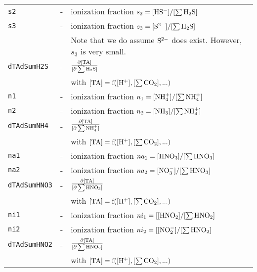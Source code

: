 \documentclass[article,nojss]{jss}
\begin{document}
\begin{footnotesize}
\begin{longtable}{l|l|p{7cm}}
\texttt{s2}       & -                                & ionization fraction $s_2 = [\rm HS^-]  / [\rm \sum H_2S]$\\
\texttt{s3}       & -                                & ionization fraction $s_3 = [\rm S^{2-}]  / [\rm \sum H_2S]$ \\
            &                                        & Note that we do assume $\rm S^{2-}$ does exist. However, $s_3$ is very small.\\
\texttt{dTAdSumH2S}   & -                               & $\rm \frac{\partial [TA]}{[\partial \sum H_2S]}$\\
                   &                                  & with $\rm [TA] = f([H^+], [\sum CO_2], ...)$\\     
\texttt{n1}       & -                                & ionization fraction $n_1 = [\rm NH_4^+] / [\rm \sum NH_4^+]$\\
\texttt{n2}       & -                                & ionization fraction $n_2 = [\rm NH_3] / [\rm \sum NH_4^+]$\\
\texttt{dTAdSumNH4}   & -                               & $\rm \frac{\partial [TA]}{[\partial \sum NH_4^+]}$\\
                   &                                  & with $\rm [TA] = f([H^+], [\sum CO_2], ...)$\\     
\texttt{na1}      & -                                 & ionization fraction $na_1 = [\rm HNO_3] / [\sum HNO_3]$\\
\texttt{na2}      & -                                 & ionization fraction $na_2 = [\rm NO_3^-] / [\sum HNO_3]$\\
\texttt{dTAdSumHNO3}   & -                               & $\rm \frac{\partial [TA]}{[\partial \sum HNO_3]}$\\
                   &                                  & with $\rm [TA] = f([H^+], [\sum CO_2], ...)$\\     
\texttt{ni1}       & -                               & ionization fraction $ni_1 = [\rm [HNO_2] / [\rm \sum HNO_2]$\\
\texttt{ni2}       & -                               & ionization fraction $ni_2 = [\rm [NO_2^-] / [\rm \sum HNO_2]$\\
\texttt{dTAdSumHNO2}   & -                               & $\rm \frac{\partial [TA]}{[\partial \sum HNO_2]}$\\
                   &                                  & with $\rm [TA] = f([H^+], [\sum CO_2], ...)$\\         

\end{longtable}
\end{footnotesize}
\end{document}
